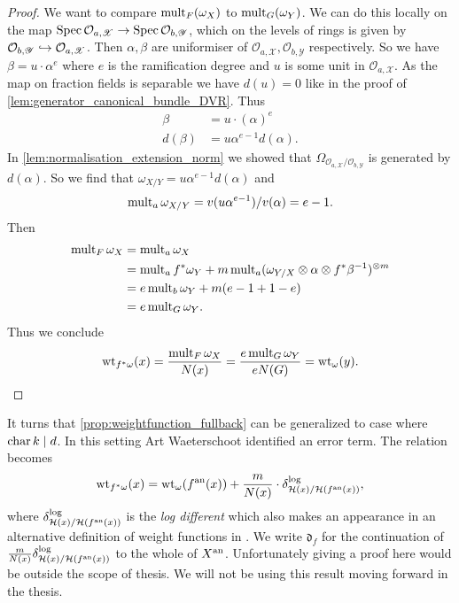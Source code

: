 \begin{proof}
	We want to compare $\operatorname{mult}_{F}(\omega_X)$ to $\operatorname{mult}_{G}(\omega_Y)$. 
	We can do this locally on the map $\operatorname{Spec} \mathcal{O}_{a, \mathscr X} \to \operatorname{Spec} \mathcal{O}_{b, \mathscr Y}$,
	which on the levels of rings is given by $ \mathcal{O}_{b, \mathscr Y}\hookrightarrow  \mathcal{O}_{a, \mathscr X}$.
	Then $\alpha, \beta$ are uniformiser of $\mathcal{O}_{a, \mathscr X}, \mathcal{O}_{b, \mathscr Y}$ respectively. 
	So we have $\beta = u\cdot \alpha ^{e}$ where $e$ is the ramification degree and $u$ is some unit in $\mathcal{O}_{a, \mathscr X}$. 
	As the map on fraction fields is separable we have $d(u) = 0$ like in the proof of \cref{lem:generator_canonical_bundle_DVR}. 
	Thus
	\begin{align*}
		\beta &= u \cdot (\alpha)^e \\
		d(\beta) &= u \alpha^{e-1} d(\alpha)
	.\end{align*}
	In \cref{lem:normalisation_extension_norm} we showed that $\Omega_{\mathcal{O}_{a, \mathscr X} / \mathcal{O}_{b, \mathscr Y}}$ is generated by $d(\alpha)$. 
	So we find that $\omega_{X / Y} = u \alpha ^{e-1} d(\alpha)$ and \[
		\operatorname{mult}_{a} \omega_{X / Y} = v(u \alpha ^{e-1}) / v(\alpha) = e-1
	.\] 
	Then  
	\begin{align*}
		\operatorname{mult}_{F} \omega_X &= \operatorname{mult}_{a} \omega _X\\
				   &=  \operatorname{mult}_{a} f^*\omega_Y +  m \operatorname{mult}_{a} (\omega_{Y / X} \otimes \alpha \otimes f^*\beta ^{-1})^{\otimes m} \\
				   &= e \operatorname{mult}_b \omega_Y + m(e-1 + 1 -e) \\
				   &= e\operatorname{mult}_{G}\omega_Y 
	.\end{align*} 
	Thus we conclude 
	 \[
		 \operatorname{wt}_{f^* \omega}(x) = \frac{\operatorname{mult}_{F} \omega_X}{N(x)} = \frac{e\operatorname{mult}_G \omega_Y}{eN(G)} = \operatorname{wt}_{\omega}(y)
	.\] 
\end{proof}

\begin{remark}\label{rem:weightfunction_fullback_art} 
	It turns that \cref{prop:weightfunction_fullback} can be generalized to case where $\operatorname{char} k \mid d$. 
	In this setting Art Waeterschoot identified an error term. 
	The relation becomes \[
		\operatorname{wt}_{f^* \omega}(x) = \operatorname{wt}_{\omega}(f{}^{\text{an}} (x)) + \frac{m}{N(x)} \cdot \delta_{\mathcal{H} (x) / \mathcal{H} (f{}^{\text{an}}(x))}^{\text{log}}
	,\] 
	where $\delta_{\mathcal{H} (x) / \mathcal{H} (f{}^{\text{an}}(x))}^{\text{log}}$ is the \emph{log different} which also makes an appearance in an alternative definition of weight functions in \cite{temkinMetrizationDifferentialPluriforms2016a}.
	We write $\mathfrak{d}_f $ for the continuation of $\frac{m}{N(x)} \delta_{\mathcal{H} (x) / \mathcal{H} (f{}^{\text{an}}(x))}^{\text{log}}$ to the whole of $X{}^{\text{an}}$. 
	Unfortunately giving a proof here would be outside the scope of thesis.
	We will not be using this result moving forward in the thesis. 
\end{remark}


